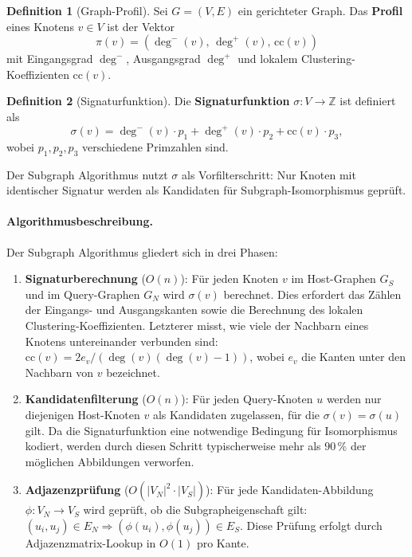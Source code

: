 ﻿\documentclass[a4paper,12pt]{scrreprt}
\theoremstyle{definition}
\newtheorem{definition}{Definition}[chapter]
\begin{document}
	\begin{definition}[Graph-Profil]
		Sei $G = (V, E)$ ein gerichteter Graph. Das \textbf{Profil} ei\-nes
		Knotens $v \in V$ ist der Vektor
		\[
		\pi(v) = (\deg^-(v),\, \deg^+(v),\, \mathrm{cc}(v))
		\]
		mit Eingangsgrad $\deg^-$, Ausgangsgrad $\deg^+$ und lokalem
		Clustering-Koeffizienten $\mathrm{cc}(v)$.
	\end{definition}

	\begin{definition}[Signaturfunktion]\label{def:sig}
		Die \textbf{Signaturfunktion} $\sigma: V \to \mathbb{Z}$ ist definiert als
		\[
		\sigma(v) = \deg^-(v) \cdot p_1 + \deg^+(v) \cdot p_2
		+ \mathrm{cc}(v) \cdot p_3,
		\]
		wobei $p_1, p_2, p_3$ verschiedene Primzahlen sind.
	\end{definition}

	Der Subgraph Algorithmus \cite{Epp2026subgraph} nutzt $\sigma$ als
	Vorfilterschritt: Nur Knoten mit identischer Signatur werden als
	Kandidaten für Subgraph-Isomorphismus geprüft.

	\paragraph{Algorithmusbeschreibung.}
	Der Subgraph Algorithmus gliedert sich in drei Phasen:
	\begin{enumerate}
		\item \textbf{Signaturberechnung} ($O(n)$): Für jeden Knoten $v$
		im Host-Graphen $G_S$ und im Query-Graphen $G_N$ wird $\sigma(v)$
		berechnet. Dies erfordert das Zählen der Eingangs- und Ausgangskanten
		sowie die Berechnung des lokalen Clustering-Koeffizienten. Letzterer
		misst, wie viele der Nachbarn eines Knotens untereinander verbunden sind:
		$\mathrm{cc}(v) = 2 e_v / (\deg(v)(\deg(v)-1))$, wobei $e_v$ die Kanten
		unter den Nachbarn von $v$ bezeichnet.
		\item \textbf{Kandidatenfilterung} ($O(n)$): Für jeden Query-Knoten $u$
		werden nur diejenigen Host-Knoten $v$ als Kandidaten zugelassen, für die
		$\sigma(v) = \sigma(u)$ gilt. Da die Signaturfunktion eine notwendige
		Bedingung für Isomorphismus kodiert, werden durch diesen Schritt typischerweise
		mehr als $90\,\%$ der möglichen Abbildungen verworfen.
		\item \textbf{Adjazenzprüfung} ($O(|V_N|^2 \cdot |V_S|)$): Für jede
		Kandidaten-Abbildung $\phi: V_N \to V_S$ wird geprüft, ob die
		Subgrapheigenschaft gilt: $(u_i, u_j) \in E_N \Rightarrow (\phi(u_i), \phi(u_j)) \in E_S$.
		Diese Prüfung erfolgt durch Adjazenzmatrix-Lookup in $O(1)$ pro Kante.
	\end{enumerate}
\end{document}
